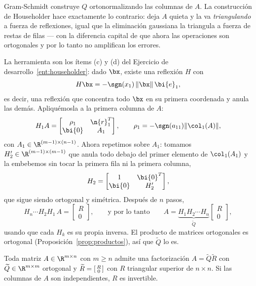 Gram-Schmidt construye $Q$ ortonormalizando las columnas de $A$. La
construcción de Householder hace exactamente lo contrario: deja $A$ quieta y
la va \emph{triangulando} a fuerza de reflexiones, igual que la eliminación
gaussiana la triangula a fuerza de restas de filas --- con la diferencia
capital de que ahora las operaciones son ortogonales y por lo tanto no
amplifican los errores.

La herramienta son los ítems (c) y (d) del Ejercicio de
desarrollo~\ref{ent:householder}: dado $\bx$, existe una reflexión $H$ con
\[
H\bx=-\sgn(x_1)\,\|\bx\|\,\bi{e}_1 ,
\]
es decir, una reflexión que concentra todo $\bx$ en su primera coordenada y
anula las demás. Apliquémosla a la primera columna de $A$:
\[
H_1A=\begin{bmatrix}
\rho_1 & \n{r}_1^T\\
\bi{0} & A_1
\end{bmatrix},
\qquad \rho_1=-\sgn(a_{11})\|\col_1(A)\| ,
\]
con $A_1\in\R^{(m-1)\times(n-1)}$. Ahora repetimos sobre $A_1$: tomamos
$H_2'\in\R^{(m-1)\times(m-1)}$ que anula todo debajo del primer elemento de
$\col_1(A_1)$ y la embebemos sin tocar la primera fila ni la primera columna,
\[
H_2=\begin{bmatrix}1&\bi{0}^T\\ \bi{0}&H_2'\end{bmatrix},
\]
que sigue siendo ortogonal y simétrica. Después de $n$ pasos,
\[
H_n\cdots H_2H_1\,A=\begin{bmatrix}R\\ 0\end{bmatrix},
\qquad\text{y por lo tanto}\qquad
A=\underbrace{H_1H_2\cdots H_n}_{\widetilde{Q}}
\begin{bmatrix}R\\ 0\end{bmatrix},
\]
usando que cada $H_k$ es su propia inversa. El producto de matrices
ortogonales es ortogonal (Proposición~\ref{prop:productos}), así que
$\widetilde{Q}$ lo es.

\begin{teorema}\label{teo:QR-householder}
Toda matriz $A\in\R^{m\times n}$ con $m\ge n$ admite una factorización
$A=\widetilde{Q}\widetilde{R}$ con $\widetilde{Q}\in\R^{m\times m}$ ortogonal
y $\widetilde{R}=\begin{bsmallmatrix}R\\ 0\end{bsmallmatrix}$ con $R$
triangular superior de $n\times n$. Si las columnas de $A$ son
independientes, $R$ es invertible.
\end{teorema}

